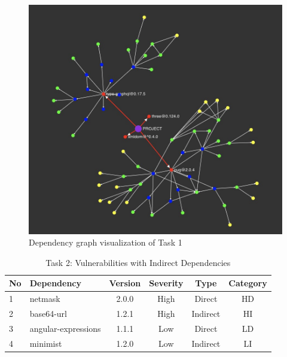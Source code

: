 \documentclass[conference]{IEEEtran}
\begin{document}
	\begin{figure}[tb]
		\centering
		\includegraphics[width=\columnwidth]{Figures/Achilles-Test1.jpeg}
		\caption{Dependency graph visualization of Task 1}
		\label{fig:graphtest1}
	\end{figure}
	
	
	\begin{table}[tb]
		\centering
		\caption{Task 2: Vulnerabilities with Indirect Dependencies}
		\begin{tabular}{llcccc}
			\toprule
			No & Dependency & Version & Severity & Type & Category \\
			\midrule
			1 & netmask & 2.0.0 & High & Direct & HD \\ 
			2 & base64-url & 1.2.1 & High & Indirect & HI \\
			3 & angular-expressions & 1.1.1 & Low & Direct & LD \\ 
			4 & minimist & 1.2.0 & Low & Indirect & LI \\
			\bottomrule
		\end{tabular}
		\label{table:cha-test2}
	\end{table}
	
\end{document}
